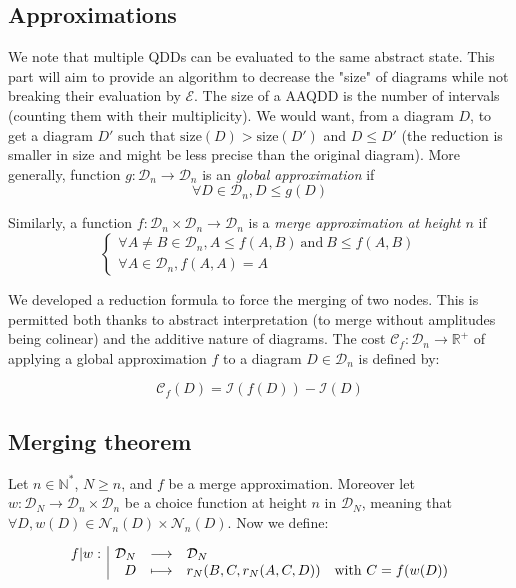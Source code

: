 \subsection{Approximations}

We note that multiple QDDs can be evaluated to the same abstract state. This part will aim to provide an algorithm to decrease the "size" of diagrams while not breaking their evaluation by $\mathcal{E}$. The size of a AAQDD is the number of intervals (counting them with their multiplicity). We would want, from a diagram $D$, to get a diagram $D'$ such that $\text{size}(D) > \text{size}(D')$ and $D \le D'$ (the reduction is smaller in size and might be less precise than the original diagram). More generally, function $g : \mathcal{D}_n \rightarrow \mathcal{D}_n$ is an \textit{global approximation} if
$$\forall D \in \mathcal{D}_n, D \le g(D)$$

Similarly, a function $f : \mathcal{D}_n \times \mathcal{D}_n \rightarrow \mathcal{D}_n$ is a \textit{merge approximation at height $n$} if
$$\begin{cases}
    \forall A \not= B \in \mathcal{D}_n, A \le f(A, B)~\text{and}~B \le f(A, B) \\
    \forall A \in \mathcal{D}_n, f(A, A) = A
\end{cases}
$$

We developed a reduction formula to force the merging of two nodes. This is permitted both thanks to abstract interpretation (to merge without amplitudes being colinear) and the additive nature of diagrams. The cost $\mathcal{C}_f : \mathcal{D}_n \rightarrow \mathbb{R}^+$ of applying a global approximation $f$ to a diagram $D \in \mathcal{D}_n$ is defined by:

$$\mathcal{C}_f(D) = \mathcal{I}(f(D)) - \mathcal{I}(D)$$

\subsection{Merging theorem}

Let $n \in \mathbb{N}^*$, $N \ge n$, and $f$ be a merge approximation. Moreover let $w : \mathcal{D}_N \rightarrow \mathcal{D}_n \times \mathcal{D}_n$ be a choice function at height $n$ in $\mathcal{D}_N$, meaning that $\forall D, w(D) \in \mathcal{N}_n(D) \times \mathcal{N}_n(D)$. Now we define:

$$\begin{array}{l|rcl} f | w: & \mathcal{D}_N & \longrightarrow & \mathcal{D}_N \\ & D & \longmapsto & r_N(B, C, r_N(A, C, D))\quad \text{with}~C = f(w(D)) \end{array}$$

